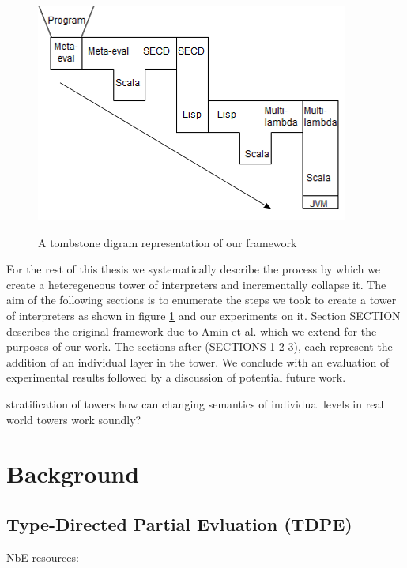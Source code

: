 \documentclass{article}
\theoremstyle{definition}
\begin{document}
\begin{figure}[t]
	\centering
	\includegraphics[scale=2]{tombstone_tower.png}
	\label{fig:tombstone}
	\caption{A tombstone digram representation of our framework}
\end{figure}

For the rest of this thesis we systematically describe the process by which we create a heteregeneous tower of interpreters and incrementally collapse it. The aim of the following sections is to enumerate the steps we took to create a tower of interpreters as shown in figure \ref{fig:tombstone} and our experiments on it. Section SECTION describes the original framework due to Amin et al. \cite{amin2017collapsing} which we extend for the purposes of our work. The sections after (SECTIONS 1 2 3), each represent the addition of an individual layer in the tower. We conclude with an evaluation of experimental results followed by a discussion of potential future work.

stratification of towers
how can changing semantics of individual levels in real world towers work soundly?

\section{Background}
\subsection{Type-Directed Partial Evluation (TDPE)}
NbE resources:
\end{document}
